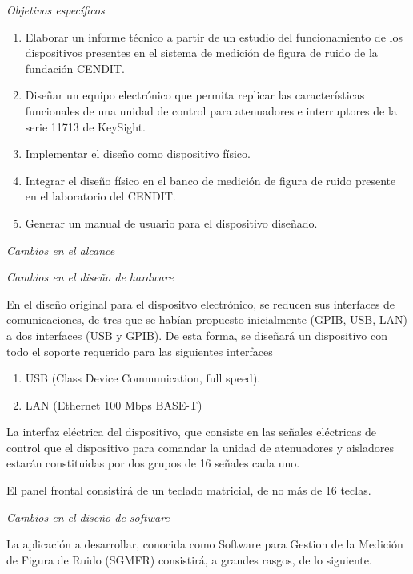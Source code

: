 \documentclass[paper=letter,oneside,fontsize=12pt, parskip=full]{article}
\begin{document}
	\emph{Objetivos específicos}
	
	\begin{enumerate}
		\item Elaborar un informe técnico a partir de un estudio del funcionamiento de los
		dispositivos presentes en el sistema de medición de figura de ruido de la fundación
		CENDIT.
		
		\item Diseñar un equipo electrónico que permita replicar las características funcionales de
		una unidad de control para atenuadores e interruptores de la serie 11713 de KeySight.
		
		\item Implementar el diseño como dispositivo físico.
		
		\item Integrar el diseño físico en el banco de medición de figura de ruido presente en el
		laboratorio del CENDIT.
		
		\item Generar un manual de usuario para el dispositivo diseñado.
	\end{enumerate}	

	\emph{Cambios en el alcance}
	
	\emph{Cambios en el diseño de hardware}

	En el diseño original para el dispositvo electrónico, se reducen sus  interfaces de comunicaciones, de tres que se habían propuesto inicialmente (GPIB, USB, LAN) a dos interfaces (USB y GPIB). De esta forma, se diseñará un dispositivo con todo el soporte requerido para las siguientes interfaces
	
	\begin{enumerate}
		\item USB (Class Device Communication, full speed).		
		\item LAN (Ethernet 100 Mbps BASE-T)
	\end{enumerate}

	La interfaz eléctrica del dispositivo,  que consiste en las señales eléctricas de control que el dispositivo para comandar la unidad de atenuadores y aisladores estarán constituidas por dos grupos de 16 señales cada uno. 
	
	El panel frontal consistirá de un teclado matricial, de no más de 16 teclas. 
	
	\emph{Cambios en el diseño de software}
	
	La aplicación a desarrollar, conocida como Software para Gestion de la Medición de Figura de Ruido (SGMFR) consistirá, a grandes rasgos, de lo siguiente.
	
\end{document}
